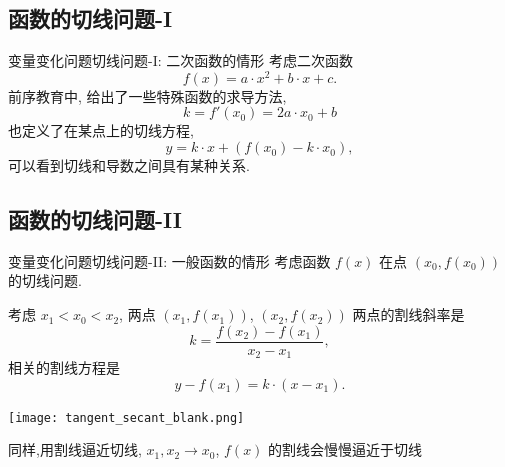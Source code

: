 \documentclass[
10pt,
aspectratio=43,
]{beamer}
\begin{document}
\subsection{函数的切线问题-I} %

\begin{frame}{变量变化问题}{切线问题-I: 二次函数的情形}
	考虑二次函数
	\[
		f(x) = a\cdot x^2 + b\cdot x +c.
	\]
	\pause
	前序教育中, 给出了一些特殊函数的求导方法,
	\[
		k = f'(x_0) = 2  a \cdot x_0 + b
	\]
	\pause
	也定义了在某点上的切线方程,
	\[
		y = k \cdot x + (f(x_0) - k \cdot x_0),
	\]
	可以看到切线和导数之间具有某种关系.
\end{frame}

\subsection{函数的切线问题-II}
\begin{frame}{变量变化问题}{切线问题-II: 一般函数的情形}
    考虑函数 $f(x)$ 在点 $(x_0,f(x_0))$ 的切线问题.
    
    \pause
    考虑 $x_1<x_0<x_2$, 两点 $(x_1,f(x_1))$, $(x_2,f(x_2))$ 两点的割线斜率是
    \begin{equation*}
        k=\frac{f(x_2)-f(x_1)}{x_2-x_1},
    \end{equation*}
    \pause
    相关的割线方程是
    \begin{equation*}
        y-f(x_1)=k\cdot(x-x_1).
    \end{equation*}
    \pause
    \begin{center}
        \texttt{[image: tangent\_secant\_blank.png]}
    \end{center}
    同样,用割线逼近切线, $x_1,x_2\to x_0$, $f(x)$ 的割线会慢慢逼近于切线
\end{frame}
\end{document}
